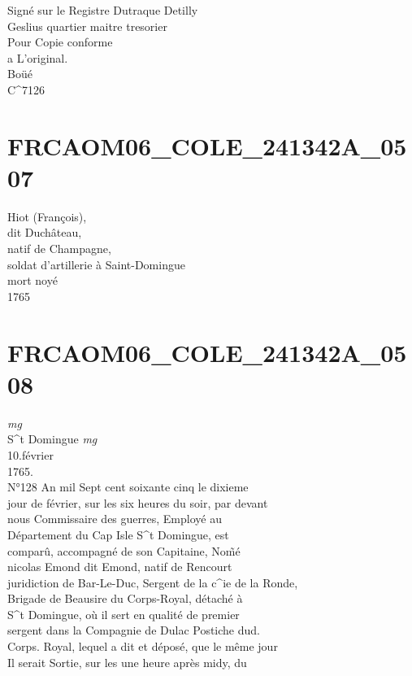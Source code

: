 \documentclass{article}
\begin{document}
\begin{pages}
Signé sur le Registre Dutraque Detilly\\
Geslius quartier maitre tresorier\\
Pour Copie conforme\\
a L'original.\\
Boüé\\
C\^{}7126
\pend
\endnumbering\beginnumbering\section{FRCAOM06\_COLE\_241342A\_0507}\pstart
Hiot (François),\\
dit Duchâteau,\\
natif de Champagne,\\
soldat d'artillerie à Saint-Domingue\\
mort noyé\\
1765
\pend
\endnumbering\beginnumbering\section{FRCAOM06\_COLE\_241342A\_0508}
\vspace{0.5cm}\noindent
\textit{mg}
\footnotesize \\
S\^{}t Domingue
\normalsize 
\vspace{0.5cm}\noindent
\textit{mg}
\footnotesize \\
10.février\\
1765.\\
N°128
\normalsize \pstart
An mil Sept cent soixante cinq le dixieme\\
jour de février, sur les six heures du soir, par devant\\
nous Commissaire des guerres, Employé au\\
Département du Cap Isle S\^{}t Domingue, est\\
comparû, accompagné de son Capitaine, Nom̃é\\
nicolas Emond dit Emond, natif de Rencourt\\
juridiction de Bar-Le-Duc, Sergent de la c\^{}ie de la Ronde,\\
Brigade de Beausire du Corps-Royal, détaché à\\
S\^{}t Domingue, où il sert en qualité de premier\\
sergent dans la Compagnie de Dulac Postiche dud.\\
Corps. Royal, lequel a dit et déposé, que le même jour\\
Il serait Sortie, sur les une heure après midy, du\\

\end{pages}
\end{document}

